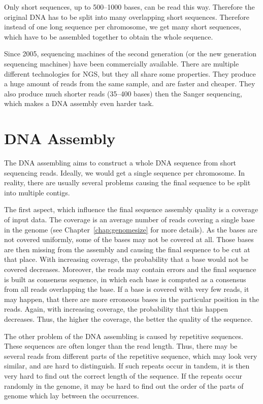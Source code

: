 Only short sequences, up to 500--1000 bases, can be read this way. Therefore the original DNA has to be split into many overlapping short sequences.
Therefore instead of one long sequence per chromosome, we get many short sequences, which have to be assembled together to obtain the whole sequence.

Since 2005, sequencing machines of the second generation (or the new generation sequencing machines) have been commercially available. There are multiple different technologies for NGS, but they all share some properties.
They produce a huge amount of reads from the same sample, and are faster and cheaper. They also produce much shorter reads (35--400 bases) then the Sanger sequencing, which makes a DNA assembly even harder task.

\section{DNA Assembly}

The DNA assembling aims to construct a whole DNA sequence from short sequencing reads. Ideally, we would get a single sequence per chromosome. In reality, there are usually several problems causing the final sequence to be split into multiple contigs.

The first aspect, which influence the final sequence assembly quality is a coverage of input data. The coverage is an average number of reads covering a single base in the genome (see Chapter~\ref{chap:genomesize} for more details).
As the bases are not covered uniformly, some of the bases may not be covered at all. Those bases are then missing from the assembly and causing the final sequence to be cut at that place. With increasing coverage, the probability that a base would not be covered decreases.
Moreover, the reads may contain errors and the final sequence is built as consensus sequence, in which each base is computed as a consensus from all reads overlapping the base. If a base is covered with very few reads, it may happen, that there are more erroneous bases in the particular position in the reads. Again, with increasing coverage, the probability that this happen decreases. Thus, the higher the coverage, the better the quality of the sequence.

The other problem of the DNA assembling is caused by repetitive sequences. These sequences are often longer than the read length. Thus, there may be several reads from different parts of the repetitive sequence, which may look very similar, and are hard to distinguish. If such repeats occur in tandem, it is then very hard to find out the correct length of the sequence. If the repeats occur randomly in the genome, it may be hard to find out the order of the parts of genome which lay between the occurrences.

